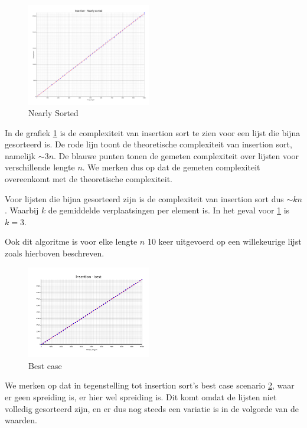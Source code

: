 \documentclass[a4paper]{article}
\begin{document}
\begin{figure}
  \begin{center}
    \includegraphics[width=0.48\textwidth]{../plots/insertion-nearly-sorted.png}
  \end{center}
  \caption{Nearly Sorted}
  \label{fig:insertion-nearly-sorted}
\end{figure}\hfill
\par
In de grafiek \ref{fig:insertion-nearly-sorted} is de complexiteit van insertion sort te zien voor een lijst die bijna gesorteerd is.
De rode lijn toont de theoretische complexiteit van insertion sort, namelijk $\sim 3n$.
De blauwe punten tonen de gemeten complexiteit over lijsten voor verschillende lengte $n$.
We merken dus op dat de gemeten complexiteit overeenkomt met de theoretische complexiteit.
\par
Voor lijsten die bijna gesorteerd zijn is de complexiteit van insertion sort dus $\sim kn$.
Waarbij $k$ de gemiddelde verplaatsingen per element is. In het geval voor \ref{fig:insertion-nearly-sorted} is $k=3$.
\par
Ook dit algoritme is voor elke lengte $n$ 10 keer uitgevoerd op een willekeurige lijst zoals hierboven beschreven.

\begin{figure}
  \begin{center}
    \includegraphics[width=0.48\textwidth]{../plots/insertion-best.png}
  \end{center}
  \caption{Best case}
  \label{fig:insertion-best}
\end{figure}

We merken op dat in tegenstelling tot insertion sort's best case scenario \ref{fig:insertion-best}, waar er geen spreiding is, er hier wel spreiding is.
Dit komt omdat de lijsten niet volledig gesorteerd zijn, en er dus nog steeds een variatie is in de volgorde van de waarden.
\end{document}
